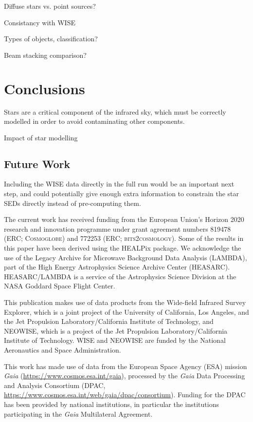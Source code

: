 \documentclass{aa}
\begin{document}

Diffuse stars vs. point sources? 

Consistancy with WISE

Types of objects, classification?

Beam stacking comparison?

\section{Conclusions}
\label{sec:conclusions}

Stars are a critical component of the infrared sky, which must be correctly modelled in order to avoid contaminating other components. 

Impact of star modelling

\subsection{Future Work}

Including the WISE data directly in the full run would be an important next step, and could potentially give enough extra information to constrain the star SEDs directly instead of pre-computing them. 




\begin{acknowledgements}
 The current work has received funding from the European
  Union’s Horizon 2020 research and innovation programme under grant
  agreement numbers 819478 (ERC; \textsc{Cosmoglobe}) and 772253 (ERC;
  \textsc{bits2cosmology}). Some of the results in this paper have been derived using the HEALPix \citep{healpix} package.
  We acknowledge the use of the Legacy Archive for Microwave Background Data
  Analysis (LAMBDA), part of the High Energy Astrophysics Science Archive Center
  (HEASARC). HEASARC/LAMBDA is a service of the Astrophysics Science Division at
  the NASA Goddard Space Flight Center.  
  
   This publication makes use of data products from the Wide-field Infrared Survey Explorer, which is a joint project of the University of California, Los Angeles, and the Jet Propulsion Laboratory/California Institute of Technology, and NEOWISE, which is a project of the Jet Propulsion Laboratory/California Institute of Technology. WISE and NEOWISE are funded by the National Aeronautics and Space Administration.
   
   This work has made use of data from the European Space Agency (ESA) mission
{\it Gaia} (\url{https://www.cosmos.esa.int/gaia}), processed by the {\it Gaia}
Data Processing and Analysis Consortium (DPAC,
\url{https://www.cosmos.esa.int/web/gaia/dpac/consortium}). Funding for the DPAC
has been provided by national institutions, in particular the institutions
participating in the {\it Gaia} Multilateral Agreement.
\end{acknowledgements}


%



\end{document}
